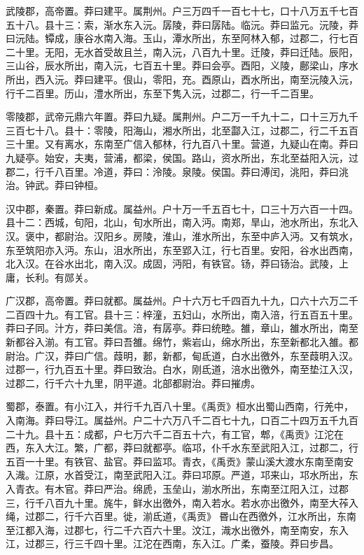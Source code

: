 \documentclass[12pt,UTF8]{ctexbook}
\begin{document}
武陵郡，高帝置。莽曰建平。属荆州。户三万四千一百七十七，口十八万五千七百五十八。县十三：索，渐水东入沅。孱陵，莽曰孱陆。临沅。莽曰监元。沅陵，莽曰沅陆。镡成，康谷水南入海。玉山，潭水所出，东至阿林入郁，过郡二，行七百二十里。无阳，无水首受故且兰，南入沅，八百九十里。迁陵，莽曰迁陆。辰阳，三山谷，辰水所出，南入沅，七百五十里。莽曰会亭。酉阳，义陵，鄜梁山，序水所出，西入沅。莽曰建平。佷山，零阳，充。酉原山，酉水所出，南至沅陵入沅，行千二百里。历山，澧水所出，东至下隽入沅，过郡二，行一千二百里。



零陵郡，武帝元鼎六年置。莽曰九疑。属荆州。户二万一千九十二，口十三万九千三百七十八。县十：零陵，阳海山，湘水所出，北至酃入江，过郡二，行二千五百三十里。又有离水，东南至广信入郁林，行九百八十里。营道，九疑山在南。莽曰九疑亭。始安，夫夷，营浦，都梁，侯国。路山，资水所出，东北至益阳入沅，过郡二，行千八百里。冷道，莽曰：泠陵。泉陵。侯国。莽曰溥闰，洮阳，莽曰洮治。钟武。莽曰钟桓。



汉中郡，秦置。莽曰新成。属益州。户十万一千五百七十，口三十万六百一十四。县十二：西城，旬阳，北山，旬水所出，南入沔。南郑，旱山，池水所出，东北入汉。褒中，都尉治。汉阳乡。房陵，淮山，淮水所出，东至中庐入沔。又有筑水，东至筑阳亦入沔。东山，沮水所出，东至郢入江，行七百里。安阳，谷水出西南，北入汉。在谷水出北，南入汉。成固，沔阳，有铁官。钖，莽曰钖治。武陵，上庸，长利。有郧关。



广汉郡，高帝置。莽曰就都。属益州。户十六万七千四百九十九，口六十六万二千二百四十九。有工官。县十三：梓潼，五妇山，水所出，南入涪，行五百五十里。莽曰子同。汁方，莽曰美信。涪，有孱亭。莽曰统睦。雒，章山，雒水所出，南至新都谷入湔。有工官。莽曰吾雒。绵竹，紫岩山，绵水所出，东至新都北入雒。都尉治。广汉，莽曰广信。葭明，郪，新都，甸氐道，白水出徼外，东至葭明入汉。过郡一，行九百五十里。莽曰致治。白水，刚氐道，涪水出徼外，南至垫江入汉，过郡二，行千六十九里，阴平道。北部都尉治。莽曰摧虏。



蜀郡，泰置。有小江入，并行千九百八十里。《禹贡》桓水出蜀山西南，行羌中，入南海。莽曰导江。属益州。户二十六万八千二百七十九，口百二十四万五千九百二十九。县十五：成都，户七万六千二百五十六，有工官，郫，《禹贡》江沱在西，东入大江。繁，广都，莽曰就都亭。临邛，仆千水东至武阳入江，过郡二，行五百一十里。有铁官、盐官。莽曰监邛。青衣，《禹贡》蒙山溪大渡水东南至南安入渽。江原，水首受江，南至武阳入江。莽曰邛原。严道，邛来山，邛水所出，东入青衣。有木官。莽曰严治。绵虒，玉垒山，湔水所出，东南至江阳入江，过郡三，行千八百九十里。旄牛，鲜水出徼外，南入若水。若水亦出徼外，南至大莋入绳，过郡二，行千六百里。徙，湔氐道，《禹贡》昬山在西徼外，江水所出，东南至江都入海，过郡七，行二千六百六十里。汶江，渽水出徼外，南至南安，东入江，过郡三，行三千四十里。江沱在西南，东入江。广柔，蚕陵。莽曰步昌。
\end{document}
